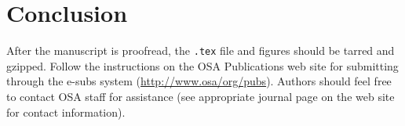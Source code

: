 \documentclass[letterpaper,11pt]{article}   %
\begin{document}
\section{Conclusion}

After the manuscript is proofread, the \texttt{.tex} file and figures
should be tarred and gzipped.  Follow the instructions on the OSA
Publications web site for submitting through the e-subs system
(\href{http://www.osa/org/pubs}{http://www.osa/org/pubs}). Authors should feel free to
contact OSA staff for assistance (see appropriate journal page on
the web site for contact information).




\end{document}
